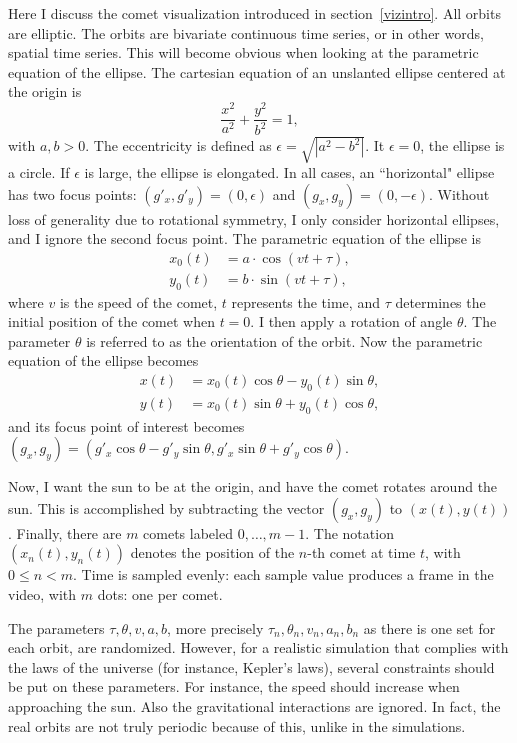 \documentclass[oneside,10pt]{book}
\begin{document}
Here I discuss the comet visualization introduced in section~\ref{vizintro}. All orbits are elliptic. The orbits are bivariate continuous time series, or in other words, spatial time series. This will become obvious when looking at the parametric equation of the ellipse. The cartesian equation of an unslanted ellipse centered at the origin is 
$$\frac{x^2}{a^2}+\frac{y^2}{b^2}=1,
$$
with $a,b>0$. The eccentricity is defined as $\epsilon=\sqrt{|a^2-b^2|}$. It $\epsilon=0$, the ellipse is a circle. If $\epsilon$ is large, the ellipse is elongated. In all cases, an ``horizontal" ellipse has two focus points: $(g'_x,g'_y)=(0, \epsilon)$ and $(g_x,g_y)=(0,-\epsilon)$. Without loss of generality due to rotational symmetry, I only consider horizontal ellipses, and I ignore the second focus point. The parametric equation of the ellipse is
\begin{align}
x_0(t) & = a\cdot\cos(vt+\tau),\nonumber \\
y_0(t) & = b\cdot\sin(vt+\tau),\nonumber 
\end{align}
where $v$ is the speed of the comet, $t$ represents the time, and $\tau$ determines the initial position of the comet when $t=0$.
I then apply a rotation of angle $\theta$. The parameter $\theta$ is referred to as the orientation of the orbit. Now the parametric equation of the ellipse becomes
\begin{align}
x(t) & = x_0(t) \cos\theta - y_0(t)\sin \theta,\nonumber \\
y(t) & = x_0(t) \sin\theta + y_0(t)\cos \theta,\nonumber 
\end{align}
and its focus point of interest becomes $(g_x,g_y)= (g'_x \cos\theta - g'_y\sin \theta,g'_x \sin\theta + g'_y\cos \theta)$.

Now, I want the sun to be at the origin, and have the comet rotates around the sun. This is accomplished by subtracting the vector $(g_x,g_y)$  
to $(x(t),y(t))$. Finally, there are $m$ comets labeled $0,\dots,m-1$. The notation $(x_n(t),y_n(t))$ denotes the position of the $n$-th comet at time
$t$, with $0\leq n<m$. Time is sampled evenly: each sample value produces a frame in the video, with $m$ dots: one per comet.

The parameters $\tau,\theta,v,a,b$, more precisely $\tau_n,\theta_n,v_n,a_n,b_n$ as there is one set for each orbit, are randomized. However, for a
realistic simulation that complies with the laws of the universe (for instance, Kepler's laws), several constraints should be put on these parameters. For instance, the speed should increase when approaching the sun. Also the gravitational interactions are ignored. In fact, the real orbits are not truly periodic because of this, unlike in the simulations.
\end{document}
